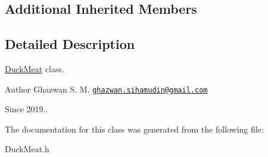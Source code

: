 \subsection*{Additional Inherited Members}


\subsection{Detailed Description}
\hyperlink{classDuckMeat}{Duck\+Meat} class.

\begin{DoxyAuthor}{Author}
Ghazwan S. M. \href{mailto:ghazwan.sihamudin@gmail.com}{\tt ghazwan.\+sihamudin@gmail.\+com} 
\end{DoxyAuthor}
\begin{DoxySince}{Since}
2019.. 
\end{DoxySince}


The documentation for this class was generated from the following file\+:\begin{DoxyCompactItemize}
\item 
Duck\+Meat.\+h\end{DoxyCompactItemize}
